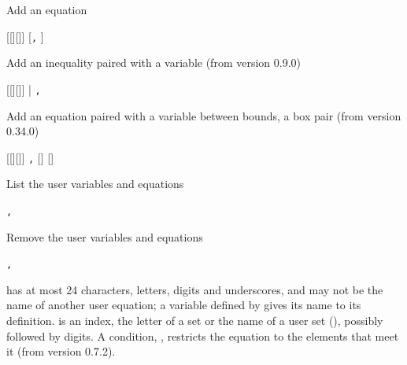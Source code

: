 Add an equation
\begin{stsyntax}
 [\cmd{(}[\cmd{,}]\cmd{)}[\cmd{$(}\cmd{)}]]\cmd{:}
 \cmd{=}  [\texttt{,} ]
\end{stsyntax}
Add an inequality paired with a variable (from version 0.9.0)
\begin{stsyntax}
 [\cmd{(}[\cmd{,}]\cmd{)}[\cmd{$(}\cmd{)}]]\cmd{:}
 | \texttt{,}
\end{stsyntax}
Add an equation paired with a variable between bounds, a box pair (from version 0.34.0)
\begin{stsyntax}
 [\cmd{(}[\cmd{,}]\cmd{)}[\cmd{$(}\cmd{)}]]\cmd{:}
 \cmd{=} \texttt{,}
 [] []
\end{stsyntax}
List the user variables and equations
\begin{stsyntax}
\texttt{,} 
\end{stsyntax}
Remove the user variables and equations
\begin{stsyntax}
\texttt{,} 
\end{stsyntax}
 has at most 24 characters, letters, digits and underscores, and
may not be the name of another user equation; a variable defined by
 gives its name to its definition.  is an index,
the letter of a set or the name of a user set (), possibly
followed by digits. A condition, \cmd{$(}\cmd{)}, restricts
the equation to the elements that meet it (from version 0.7.2).


